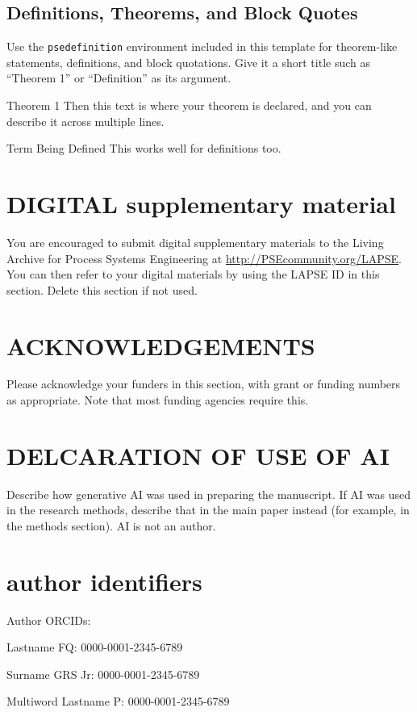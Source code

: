 \documentclass[10pt,letterpaper]{article}
\begin{document}
\subsection{Definitions, Theorems, and Block Quotes}
Use the \texttt{psedefinition} environment included in this template for theorem-like statements,
definitions, and block quotations. Give it a short title such as ``Theorem 1'' or ``Definition'' as
its argument.

\begin{psedefinition}{Theorem 1}
Then this text is where your theorem is declared, and you can describe it across multiple lines.
\end{psedefinition}

\begin{psedefinition}{Term Being Defined}
This works well for definitions too.
\end{psedefinition}

\section{DIGITAL supplementary material}
You are encouraged to submit digital supplementary materials to the Living Archive for Process
Systems Engineering at \url{http://PSEcommunity.org/LAPSE}. You can then refer to your digital
materials by using the LAPSE ID in this section. Delete this section if not used.

\section{ACKNOWLEDGEMENTS}
Please acknowledge your funders in this section, with grant or funding numbers as appropriate. Note
that most funding agencies require this.

\section{DELCARATION OF USE OF AI}
Describe how generative AI was used in preparing the manuscript. If AI was used in the research
methods, describe that in the main paper instead (for example, in the methods section). AI is not an
author.

\section{author identifiers}
Author ORCIDs:

Lastname FQ: 0000-0001-2345-6789

Surname GRS Jr: 0000-0001-2345-6789

Multiword Lastname P: 0000-0001-2345-6789

\nocite{*}
\pseprintreferences
\pseprintcopyright
\end{document}
